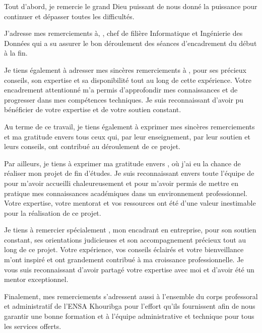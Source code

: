 \remerciements

Tout d’abord, je remercie le grand Dieu puissant de nous donné la puissance pour continuer et dépasser toutes les difficultés.

\medskip

J’adresse mes remerciements à, \textbf{}, chef de filière Informatique et Ingénierie des Données qui a su assurer le bon déroulement des séances d’encadrement du début à la fin.

\medskip

Je tiens également à adresser mes sincères remerciements à \textbf{}, pour ses précieux conseils, son expertise et sa disponibilité tout au long de cette expérience. Votre encadrement attentionné m'a permis d'approfondir mes connaissances et de progresser dans mes compétences techniques. Je suis reconnaissant d'avoir pu bénéficier de votre expertise et de votre soutien constant.

\medskip

Au terme de ce travail, je tiens également à exprimer mes sincères remerciements et ma gratitude envers tous ceux qui, par leur enseignement, par leur soutien et leurs conseils, ont contribué au déroulement de ce projet.

\medskip
Par ailleurs, je tiens à exprimer ma gratitude envers \textbf{}, où j'ai eu la chance de réaliser mon projet de fin d'études. Je suis reconnaissant envers toute l'équipe de \textbf{} pour m'avoir accueilli chaleureusement et pour m'avoir permis de mettre en pratique mes connaissances académiques dans un environnement professionnel. Votre expertise, votre mentorat et vos ressources ont été d'une valeur inestimable pour la réalisation de ce projet.

\medskip

Je tiens à remercier spécialement \textbf{}, mon encadrant en entreprise, pour son soutien constant, ses orientations judicieuses et son accompagnement précieux tout au long de ce projet. Votre expérience, vos conseils éclairés et votre bienveillance m'ont inspiré et ont grandement contribué à ma croissance professionnelle. Je vous suis reconnaissant d'avoir partagé votre expertise avec moi et d'avoir été un mentor exceptionnel.

\medskip

Finalement, mes remerciements s’adressent aussi à l’ensemble du corps professoral et administratif de l’ENSA Khouribga pour l’effort qu’ils fournissent afin de nous garantir une bonne formation et à l’équipe administrative et technique pour tous les services offerts.